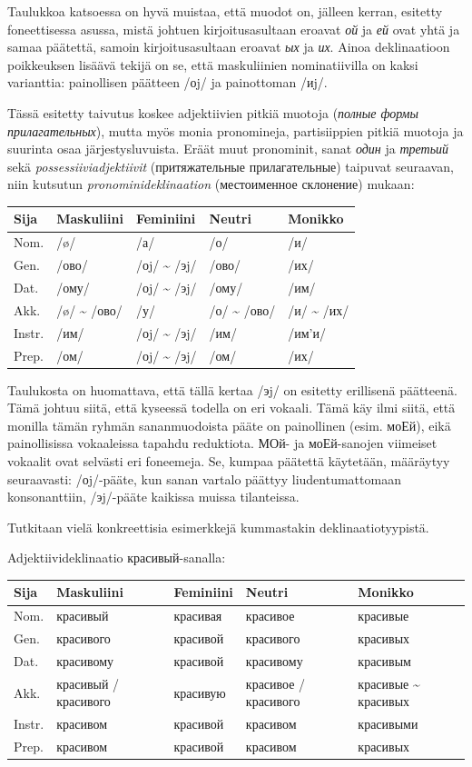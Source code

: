 \documentclass[]{scrartcl}
\begin{document}
Taulukkoa katsoessa on hyvä muistaa, että muodot on, jälleen kerran,
esitetty foneettisessa asussa, mistä johtuen kirjoitusasultaan eroavat
\emph{ой} ja \emph{ей} ovat yhtä ja samaa päätettä, samoin
kirjoitusasultaan eroavat \emph{ых} ja \emph{их}. Ainoa deklinaatioon
poikkeuksen lisäävä tekijä on se, että maskuliinien nominatiivilla on
kaksi varianttia: painollisen päätteen /оj/ ja painottoman /иj/.

Tässä esitetty taivutus koskee adjektiivien pitkiä muotoja (\emph{полные
формы прилагательных}), mutta myös monia pronomineja, partisiippien
pitkiä muotoja ja suurinta osaa järjestysluvuista. Eräät muut
pronominit, sanat \emph{один} ja \emph{третьий} sekä
\emph{possessiiviadjektiivit} (притяжательные прилагательные) taipuvat
seuraavan, niin kutsutun \emph{pronominideklinaation} (местоименное
склонение) mukaan:

\begin{longtable}[c]{@{}lllll@{}}
\toprule
Sija & Maskuliini & Feminiini & Neutri & Monikko\tabularnewline
\midrule
\endhead
Nom. & /ø/ & /а/ & /о/ & /и/\tabularnewline
Gen. & /ово/ & /оj/ \textasciitilde{} /эj/ & /ово/ & /их/\tabularnewline
Dat. & /ому/ & /оj/ \textasciitilde{} /эj/ & /ому/ & /им/\tabularnewline
Akk. & /ø/ \textasciitilde{} /ово/ & /у/ & /о/ \textasciitilde{} /ово/ &
/и/ \textasciitilde{} /их/\tabularnewline
Instr. & /им/ & /оj/ \textasciitilde{} /эj/ & /им/ &
/им'и/\tabularnewline
Prep. & /ом/ & /оj/ \textasciitilde{} /эj/ & /ом/ & /их/\tabularnewline
\bottomrule
\end{longtable}

Taulukosta on huomattava, että tällä kertaa /эj/ on esitetty erillisenä
päätteenä. Tämä johtuu siitä, että kyseessä todella on eri vokaali. Tämä
käy ilmi siitä, että monilla tämän ryhmän sananmuodoista pääte on
painollinen (esim. моЕй), eikä painollisissa vokaaleissa tapahdu
reduktiota. МОй- ja моЕй-sanojen viimeiset vokaalit ovat selvästi eri
foneemeja. Se, kumpaa päätettä käytetään, määräytyy seuraavasti:
/оj/-pääte, kun sanan vartalo päättyy liudentumattomaan konsonanttiin,
/эj/-pääte kaikissa muissa tilanteissa.

Tutkitaan vielä konkreettisia esimerkkejä kummastakin
deklinaatiotyypistä.

Adjektiivideklinaatio красивый-sanalla:

\begin{longtable}[c]{@{}lllll@{}}
\toprule
Sija & Maskuliini & Feminiini & Neutri & Monikko\tabularnewline
\midrule
\endhead
Nom. & красивый & красивая & красивое & красивые\tabularnewline
Gen. & красивого & красивой & красивого & красивых\tabularnewline
Dat. & красивому & красивой & красивому & красивым\tabularnewline
Akk. & красивый / красивого & красивую & красивое / красивого & красивые
\textasciitilde{} красивых\tabularnewline
Instr. & красивом & красивой & красивом & красивыми\tabularnewline
Prep. & красивом & красивой & красивом & красивых\tabularnewline
\bottomrule
\end{longtable}
\end{document}
